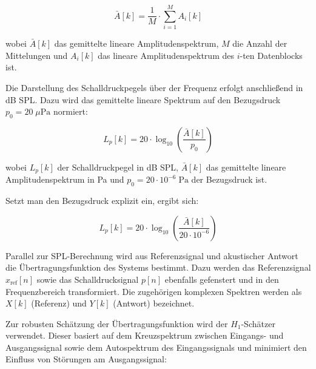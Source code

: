 


\begin{equation}
\bar{A}[k] = \frac{1}{M} \cdot \sum_{i=1}^{M} A_i[k]
\end{equation}

wobei $\bar{A}[k]$ das gemittelte lineare Amplitudenspektrum, $M$ die Anzahl der Mittelungen und $A_i[k]$ das lineare Amplitudenspektrum des $i$-ten Datenblocks ist.

Die Darstellung des Schalldruckpegels über der Frequenz erfolgt anschließend in dB SPL. Dazu wird das gemittelte lineare Spektrum auf den Bezugsdruck $p_0 = 20\;\mu\mathrm{Pa}$ normiert:

\begin{equation}
L_p[k] = 20 \cdot \log_{10}\left(\frac{\bar{A}[k]}{p_0}\right)
\end{equation}

wobei $L_p[k]$ der Schalldruckpegel in dB SPL, $\bar{A}[k]$ das gemittelte lineare Amplitudenspektrum in Pa und $p_0 = 20 \cdot 10^{-6}\;\mathrm{Pa}$ der Bezugsdruck ist.

Setzt man den Bezugsdruck explizit ein, ergibt sich:

\begin{equation}
L_p[k] = 20 \cdot \log_{10}\left(\frac{\bar{A}[k]}{20 \cdot 10^{-6}}\right)
\end{equation}

Parallel zur SPL-Berechnung wird aus Referenzsignal und akustischer Antwort die Übertragungsfunktion des Systems bestimmt. Dazu werden das Referenzsignal $x_{\mathrm{ref}}[n]$ sowie das Schalldrucksignal $p[n]$ ebenfalls gefenstert und in den Frequenzbereich transformiert. Die zugehörigen komplexen Spektren werden als $X[k]$ (Referenz) und $Y[k]$ (Antwort) bezeichnet.

Zur robusten Schätzung der Übertragungsfunktion wird der $H_1$-Schätzer verwendet. Dieser basiert auf dem Kreuzspektrum zwischen Eingangs- und Ausgangssignal sowie dem Autospektrum des Eingangssignals und minimiert den Einfluss von Störungen am Ausgangssignal:


